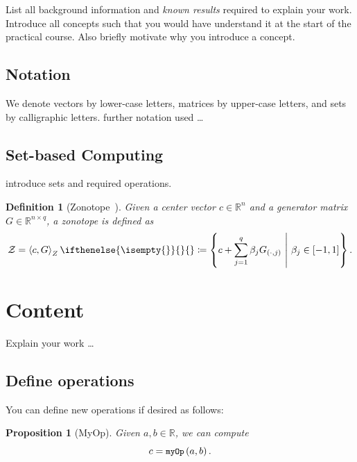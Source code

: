 \documentclass[conference]{IEEEtran}
\newcommand{\comment}[1]{{\color{tumblue} #1}}
\newtheorem{proposition}{Proposition}
\newtheorem{definition}{Definition}
\newcommand{\operator}[2]{\text{\normalfont\small\texttt{#1}}\left(#2\right)}
\newcommand{\negphantom}[1]{\settowidth{\dimen0}{#1}\hspace*{-\dimen0}} %
\newcommand{\defSet}[3][2]{\left<#3\right>_{#2}\ifthenelse{\isempty{#1}}{}{\negphantom{#2}#1\phantom{\scriptstyle #2}}}
\begin{document}
\comment{
List all background information and \emph{known results} required to explain your work. 
Introduce all concepts such that you would have understand it at the start of the practical course.
Also briefly motivate why you introduce a concept.
}

\subsection{Notation}
We denote vectors by lower-case letters, matrices by upper-case letters, and sets by calligraphic letters.
\comment{further notation used \ldots}

\subsection{Set-based Computing}

\comment{introduce sets and required operations.}

\newcommand{\defZ}[3][]{\defSet[#1]{Z}{#2,#3}}
\begin{definition}[Zonotope~{\cite[Def. 1]{girard2005reachability}}]
    \label{def:zonotope}
    Given a center vector $c\in\mathbb{R}^n$ and a generator matrix $G\in\mathbb{R}^{n\times q}$,
    a zonotope is defined as
    \begin{equation*}
        \mathcal{Z} = \defZ{c}{G} \coloneqq \left\{ c + \sum_{j=1}^{q} \beta_j G_{(\cdot,
        j)}\ \middle|\ \beta_j \in \left[-1,1\right] \right\}.
    \end{equation*}
\end{definition}

\lipsum[1-4]


\section{Content}

\comment{Explain your work \ldots}

\subsection{Define operations}

\comment{You can define new operations if desired as follows:}

\newcommand{\opMyOp}[2]{\operator{myOp}{#1,#2}}

\begin{proposition}[MyOp]
    \label{prop:myop}
    Given $a,b\in\mathbb{R}$, we can compute
    \begin{equation*}
        c = \opMyOp{a}{b}.
    \end{equation*}
\end{proposition}
\end{document}
